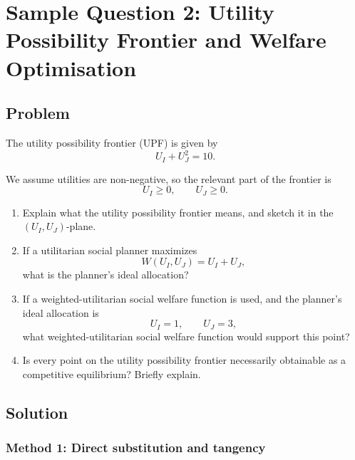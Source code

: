 \documentclass[12pt]{article}
\begin{document}
\newpage
\section{Sample Question 2: Utility Possibility Frontier and Welfare Optimisation}

\subsection{Problem}

The utility possibility frontier (UPF) is given by
\[
U_I + U_J^2 = 10.
\]

We assume utilities are non-negative, so the relevant part of the frontier is
\[
U_I \ge 0,\qquad U_J \ge 0.
\]

\begin{enumerate}[label=(\alph*)]
    \item Explain what the utility possibility frontier means, and sketch it in the \((U_I,U_J)\)-plane.
    \item If a utilitarian social planner maximizes
    \[
    W(U_I,U_J)=U_I+U_J,
    \]
    what is the planner's ideal allocation?
    \item If a weighted-utilitarian social welfare function is used, and the planner's ideal allocation is
    \[
    U_I=1,\qquad U_J=3,
    \]
    what weighted-utilitarian social welfare function would support this point?
    \item Is every point on the utility possibility frontier necessarily obtainable as a competitive equilibrium? Briefly explain.
\end{enumerate}

\newpage
\subsection{Solution}

\subsubsection{Method 1: Direct substitution and tangency}
\end{document}

